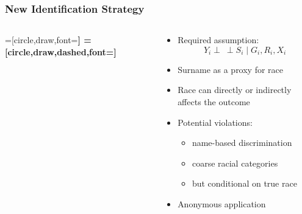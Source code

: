 \documentclass{beamer}
\newcommand{\indep}{\mathbin{\perp\!\!\!\!\!\:\perp}}
\begin{document}
\begin{frame}

\frametitle{New Identification Strategy}


  \begin{columns}
    \begin{column}{0.425\textwidth}
      =[circle,draw,font=\sffamily\Large\bfseries]
      =[circle,draw,dashed,font=\sffamily\Large\bfseries]
  \end{column}
   \begin{column}{0.575\textwidth}
      \begin{itemize}
        \item<2-> Required assumption: $$Y_i \indep S_i \mid G_i, R_i, X_i$$

        \item Surname as a proxy for race
        \item Race can directly or indirectly affects the outcome

          \medskip
        \item Potential violations:
          \begin{itemize}
          \item name-based discrimination
          \item coarse racial categories
          \item but conditional on true race
          \end{itemize}
        \item Anonymous application
      \end{itemize}
    \end{column}
  \end{columns}
  
\end{frame}
\end{document}
